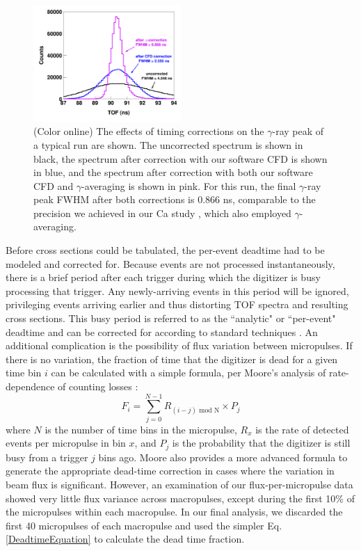 \documentclass[twocolumn,secnumarabic,amssymb, nobibnotes, aps, prl,
superscriptaddress, nobalancelastpage]{revtex4}
\begin{document}
\begin{figure}
    \includegraphics[width=0.5\textwidth]{figures/TimeCorrections.png}
    \caption{(Color online) The effects of timing corrections on the $\gamma$-ray
        peak of a typical run are shown. The uncorrected spectrum is shown in black,
        the spectrum after correction with our software CFD is shown in blue,
        and the spectrum after correction with both our software CFD and
        $\gamma$-averaging is 
        shown in pink. For this run, the final $\gamma$-ray peak 
        FWHM after both corrections is 0.866 ns, comparable to the precision we
        achieved in our Ca study \cite{Shane2010}, which also employed $\gamma$-
        averaging.
        }
    \label{TimingCorrectionStudy}
\end{figure}

Before cross sections could be tabulated, the per-event deadtime had to be
modeled and corrected for. Because events are not processed
instantaneously, there is a brief period
after each trigger during which the digitizer is busy processing that trigger.
Any newly-arriving events in this period will be ignored,
privileging events arriving earlier and thus distorting
TOF spectra and resulting cross sections. This busy period is referred to as the
``analytic" or ``per-event" deadtime and can be corrected for according to standard 
techniques
\cite{Moore1980}. An additional complication is the possibility of flux
variation between micropulses. If there is no variation, the fraction of time
that the digitizer is dead for a given time bin $i$ can be calculated with a
simple formula, per Moore's analysis of rate-dependence of counting losses
\cite{Moore1980}:
\begin{equation}
    F_{i} = \sum^{N-1}_{j=0} R_{(i-j)\text{ mod N}}\times P_{j}
    \label{DeadtimeEquation}
\end{equation}
where $N$ is the number of time bins in the micropulse, $R_{x}$ is the rate of
detected events per micropulse in bin $x$, and $P_{j}$ is the probability that the
digitizer is still busy from a trigger $j$ bins ago.
Moore also provides a more advanced formula to generate the appropriate
dead-time correction in cases where the variation in beam flux 
is significant. However, an examination of our flux-per-micropulse data showed
very little flux variance across macropulses, except during the first 10\%
of the micropulses within each macropulse. In our final analysis, we discarded 
the first 40 micropulses of each 
macropulse and used the simpler Eq. \ref{DeadtimeEquation} to calculate the dead
time fraction.
\end{document}
